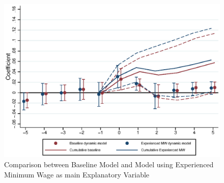 \documentclass{article}
\begin{document}
\clearpage 
\begin{figure}[htb!]\centering
	\caption{Comparison between Baseline Model and Model using Experienced Minimum Wage as main Explanatory Variable}
	\label{fig: dynamic_base_expmw_comp}
	\includegraphics[width = .8\textwidth]{../../analysis/first_differences_expmw/output/fd_model_comparison_expmw.eps}
\end{figure}
\end{document}
